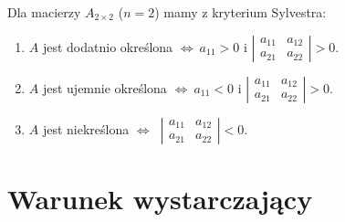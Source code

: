 \begin{przyk}
Dla macierzy $A_{2\times 2}$ ($n=2$) mamy z kryterium Sylvestra:
\begin{enumerate}[\rm 1.]
\item
$A$ jest dodatnio określona $\Leftrightarrow\ a_{11}>0$ i 
$ \left| \begin{array}{cc}
a_{11} & a_{12} \\
a_{21} & a_{22} \end{array} \right|>0$.
\item
$A$ jest ujemnie określona $\Leftrightarrow\ a_{11}<0$ i 
$ \left| \begin{array}{cc}
a_{11} & a_{12} \\
a_{21} & a_{22} \end{array} \right|>0$.
\item
$A$ jest niekreślona $\Leftrightarrow\ $
$ \left| \begin{array}{cc}
a_{11} & a_{12} \\
a_{21} & a_{22} \end{array} \right|<0$.
\end{enumerate}
\end{przyk}

\section{Warunek wystarczający}

